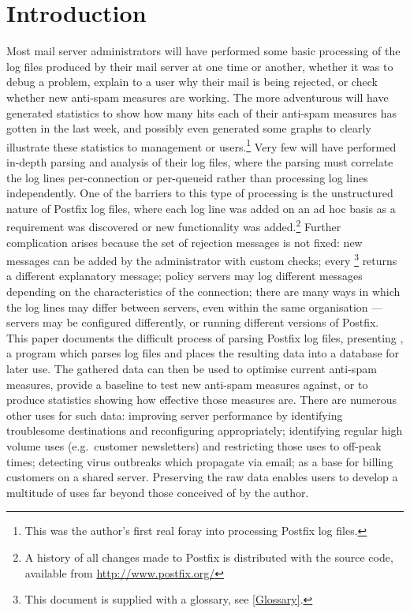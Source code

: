 \section{Introduction}

\label{introduction}

Most mail server administrators will have performed some basic processing
of the log files produced by their mail server at one time or another,
whether it was to debug a problem, explain to a user why their mail is
being rejected, or check whether new anti-spam measures are working.  The
more adventurous will have generated statistics to show how many hits each
of their anti-spam measures has gotten in the last week, and possibly even
generated some graphs to clearly illustrate these statistics to management
or users.\footnote{This was the author's first real foray into processing
Postfix log files.}  Very few will have performed in-depth parsing and
analysis of their log files, where the parsing must correlate the log lines
per-connection or per-queueid rather than processing log lines
independently.  One of the barriers to this type of processing is the
unstructured nature of Postfix log files, where each log line was added on
an ad hoc basis as a requirement was discovered or new functionality was
added.\footnote{A history of all changes made to Postfix is distributed
with the source code, available from \url{http://www.postfix.org/}} Further
complication arises because the set of rejection messages is not fixed: new
messages can be added by the administrator with custom checks; every
\DNSBL{}\footnote{This document is supplied with a glossary, see
\textsection\ref{Glossary}.} returns a different explanatory message;
policy servers may log different messages depending on the characteristics
of the connection; there are many ways in which the log lines may differ
between servers, even within the same organisation --- servers may be
configured differently, or running different versions of Postfix.  This
paper documents the difficult process of parsing Postfix log files,
presenting \PLP{}, a program which parses log files and places the
resulting data into a database for later use.  The gathered data can then
be used to optimise current anti-spam measures, provide a baseline to test
new anti-spam measures against, or to produce statistics showing how
effective those measures are.  There are numerous other uses for such data:
improving server performance by identifying troublesome destinations and
reconfiguring appropriately; identifying regular high volume uses (e.g.\
customer newsletters) and restricting those uses to off-peak times;
detecting virus outbreaks which propagate via email; as a base for billing
customers on a shared server.  Preserving the raw data enables users to
develop a multitude of uses far beyond those conceived of by the author.


